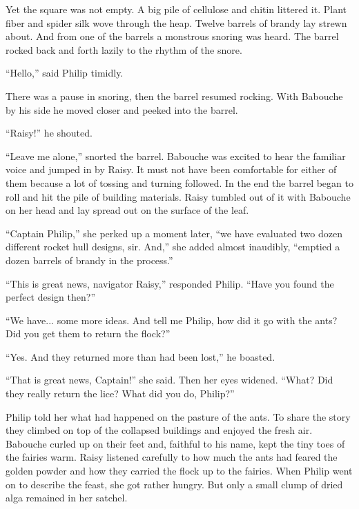 \documentclass[10pt, draft]{memoir}
\begin{document}
Yet the square was not empty. A big pile of cellulose and chitin littered it. Plant fiber and spider silk wove through the heap. Twelve barrels of brandy lay strewn about. And from one of the barrels a monstrous snoring was heard. The barrel rocked back and forth lazily to the rhythm of the snore.

``Hello,'' said Philip timidly.

There was a pause in snoring, then the barrel resumed rocking. With Babouche by his side he moved closer and peeked into the barrel.

``Raisy!'' he shouted.

``Leave me alone,'' snorted the barrel. Babouche was excited to hear the familiar voice and jumped in by Raisy. It must not have been comfortable for either of them because a lot of tossing and turning followed. In the end the barrel began to roll and hit the pile of building materials. Raisy tumbled out of it with Babouche on her head and lay spread out on the surface of the leaf.

``Captain Philip,'' she perked up a moment later, ``we have evaluated two dozen different rocket hull designs, sir. And,'' she added almost inaudibly, ``emptied a dozen barrels of brandy in the process.''

``This is great news, navigator Raisy,'' responded Philip. ``Have you found the perfect design then?''

``We have... some more ideas. And tell me Philip, how did it go with the ants? Did you get them to return the flock?''

``Yes. And they returned more than had been lost,'' he boasted.

``That is great news, Captain!'' she said. Then her eyes widened. ``What? Did they really return the lice? What did you do, Philip?''

Philip told her what had happened on the pasture of the ants. To share the story they climbed on top of the collapsed buildings and enjoyed the fresh air. Babouche curled up on their feet and, faithful to his name, kept the tiny toes of the fairies warm. Raisy listened carefully to how much the ants had feared the golden powder and how they carried the flock up to the fairies. When Philip went on to describe the feast, she got rather hungry. But only a small clump of dried alga remained in her satchel.
\end{document}
